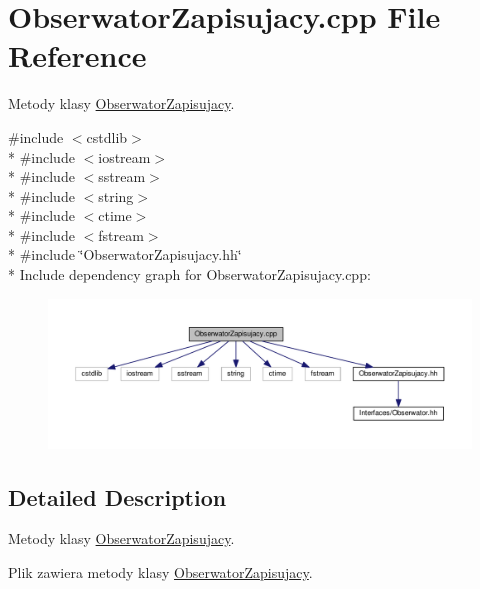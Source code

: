\hypertarget{a00045}{}\section{Obserwator\+Zapisujacy.\+cpp File Reference}
\label{a00045}


Metody klasy \hyperlink{a00014}{Obserwator\+Zapisujacy}.  


{\ttfamily \#include $<$cstdlib$>$}\\*
{\ttfamily \#include $<$iostream$>$}\\*
{\ttfamily \#include $<$sstream$>$}\\*
{\ttfamily \#include $<$string$>$}\\*
{\ttfamily \#include $<$ctime$>$}\\*
{\ttfamily \#include $<$fstream$>$}\\*
{\ttfamily \#include \char`\"{}Obserwator\+Zapisujacy.\+hh\char`\"{}}\\*
Include dependency graph for Obserwator\+Zapisujacy.\+cpp\+:
\nopagebreak
\begin{figure}[H]
\begin{center}
\leavevmode
\includegraphics[width=350pt]{a00092}
\end{center}
\end{figure}


\subsection{Detailed Description}
Metody klasy \hyperlink{a00014}{Obserwator\+Zapisujacy}. 

Plik zawiera metody klasy \hyperlink{a00014}{Obserwator\+Zapisujacy}. 